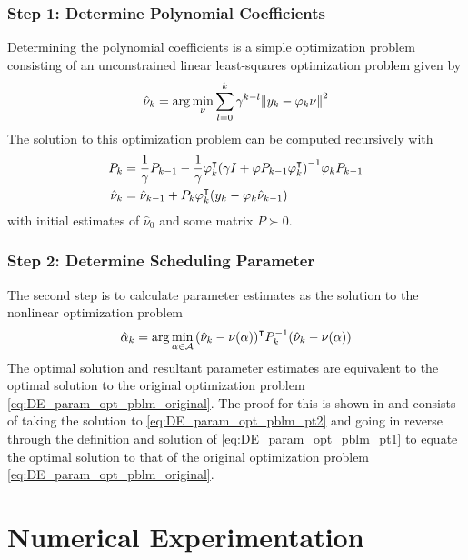 \documentclass[]{article}
\begin{document}
\subsubsection{Step 1: Determine Polynomial Coefficients}
Determining the polynomial coefficients is a simple optimization problem consisting of an unconstrained linear least-squares optimization problem given by
\begin{equation}\label{eq:DE_param_opt_pblm_pt1}
	\hat{\nu}_k = \arg \min_\nu \sum_{l=0}^k \gamma^{k-l} \norm{y_k - \varphi_k \nu}^2
\end{equation}
The solution to this optimization problem can be computed recursively with
\begin{subequations}\label{eq:DE_param_opt_pblm_pt1_soln}
	\begin{align}
		P_k &= \frac{1}{\gamma} P_{k-1} - \frac{1}{\gamma} \varphi_k^\intercal \qty(\gamma I + \varphi P_{k-1} \varphi_k^\intercal)^{-1} \varphi_k P_{k-1}\\
		\hat{\nu}_k &= \hat{\nu}_{k-1} + P_k \varphi_k^\intercal \qty(y_k - \varphi_k \hat{\nu}_{k-1})
	\end{align}
\end{subequations}
with initial estimates of $\hat{\nu}_0$ and some matrix $P\succ0$.

\subsubsection{Step 2: Determine Scheduling Parameter}
The second step is to calculate parameter estimates as the solution to the nonlinear optimization problem
\begin{equation}\label{eq:DE_param_opt_pblm_pt2}
	\hat{\alpha}_k = \arg \min_{\alpha\in\mathcal{A}} \qty(\hat{\nu}_k - \nu(\alpha))^\intercal P_k^{-1} \qty(\hat{\nu}_k - \nu(\alpha))
\end{equation}
The optimal solution and resultant parameter estimates are equivalent to the optimal solution to the original optimization problem \eqref{eq:DE_param_opt_pblm_original}. The proof for this is shown in \cite{beelen2017joint} and consists of taking the solution to \eqref{eq:DE_param_opt_pblm_pt2} and going in reverse through the definition and solution of \eqref{eq:DE_param_opt_pblm_pt1} to equate the optimal solution to that of the original optimization problem \eqref{eq:DE_param_opt_pblm_original}.



\newpage
\section{Numerical Experimentation}
\end{document}
